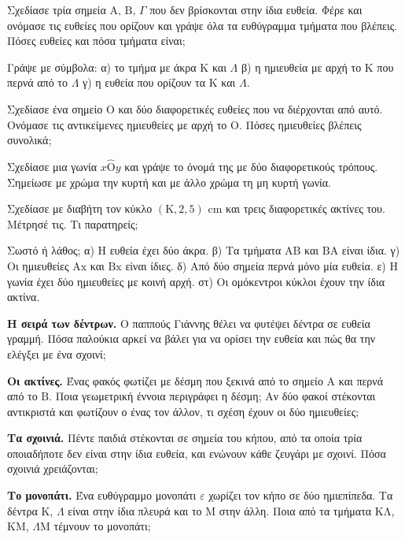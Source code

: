 \ex Σχεδίασε τρία σημεία $\mathrm{Α},\,\mathrm{Β},\,\Gamma$ που δεν βρίσκονται στην ίδια ευθεία. Φέρε και ονόμασε τις ευθείες που ορίζουν και γράψε όλα τα ευθύγραμμα τμήματα που βλέπεις. Πόσες ευθείες και πόσα τμήματα είναι;

\ex Γράψε με σύμβολα: α) το τμήμα με άκρα $\mathrm{Κ}$ και $\Lambda$ \quad β) η ημιευθεία με αρχή το $\mathrm{Κ}$ που περνά από το $\Lambda$ \quad γ) η ευθεία που ορίζουν τα $\mathrm{Κ}$ και $\Lambda$.

\ex Σχεδίασε ένα σημείο $\mathrm{Ο}$ και δύο διαφορετικές ευθείες που να διέρχονται από αυτό. Ονόμασε τις αντικείμενες ημιευθείες με αρχή το $\mathrm{Ο}$. Πόσες ημιευθείες βλέπεις συνολικά;

\ex Σχεδίασε μια γωνία $x\hat{\mathrm{Ο}}y$ και γράψε το όνομά της με δύο διαφορετικούς τρόπους. Σημείωσε με χρώμα την κυρτή και με άλλο χρώμα τη μη κυρτή γωνία.

\ex Σχεδίασε με διαβήτη τον κύκλο $(\mathrm{Κ},2{,}5)$ cm και τρεις διαφορετικές ακτίνες του. Μέτρησέ τις. Τι παρατηρείς;

\ex Σωστό ή λάθος; α) Η ευθεία έχει δύο άκρα. \quad β) Τα τμήματα $\mathrm{ΑΒ}$ και $\mathrm{ΒΑ}$ είναι ίδια. \quad γ) Οι ημιευθείες $\mathrm{Αx}$ και $\mathrm{Βx}$ είναι ίδιες. \quad δ) Από δύο σημεία περνά μόνο μία ευθεία. \quad ε) Η γωνία έχει δύο ημιευθείες με κοινή αρχή. \quad στ) Οι ομόκεντροι κύκλοι έχουν την ίδια ακτίνα.


\ex \textbf{Η σειρά των δέντρων.} Ο παππούς Γιάννης θέλει να φυτέψει δέντρα σε ευθεία γραμμή. Πόσα παλούκια αρκεί να βάλει για να ορίσει την ευθεία και πώς θα την ελέγξει με ένα σχοινί;

\ex \textbf{Οι ακτίνες.} Ένας φακός φωτίζει με δέσμη που ξεκινά από το σημείο $\mathrm{Α}$ και περνά από το $\mathrm{Β}$. Ποια γεωμετρική έννοια περιγράφει η δέσμη; Αν δύο φακοί στέκονται αντικριστά και φωτίζουν ο ένας τον άλλον, τι σχέση έχουν οι δύο ημιευθείες;

\ex \textbf{Τα σχοινιά.} Πέντε παιδιά στέκονται σε σημεία του κήπου, από τα οποία τρία οποιαδήποτε δεν είναι στην ίδια ευθεία, και ενώνουν κάθε ζευγάρι με σχοινί. Πόσα σχοινιά χρειάζονται;

\ex \textbf{Το μονοπάτι.} Ένα ευθύγραμμο μονοπάτι $\varepsilon$ χωρίζει τον κήπο σε δύο ημιεπίπεδα. Τα δέντρα $\mathrm{Κ}$, $\Lambda$ είναι στην ίδια πλευρά και το $\mathrm{Μ}$ στην άλλη. Ποια από τα τμήματα $\mathrm{ΚΛ}$, $\mathrm{ΚΜ}$, $\Lambda\mathrm{Μ}$ τέμνουν το μονοπάτι;

